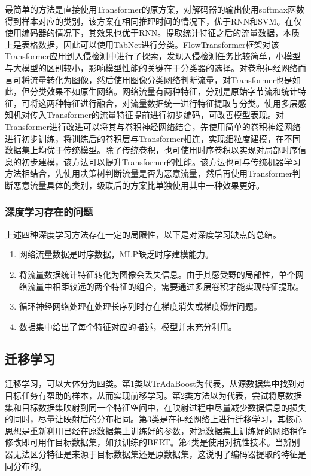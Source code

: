 最简单的方法是直接使用Transformer的原方案，对解码器的输出使用softmax函数得到样本对应的类别，该方案在相同推理时间的情况下，优于RNN和SVM\cite{10.1109/ACCESS.2022.3182333}。在仅使用编码器的情况下，其效果也优于RNN\cite{10.1016/j.comnet.2023.110072}。提取统计特征之后的流量数据，本质上是表格数据，因此可以使用TabNet进行分类\cite{PMID:37844095}。FlowTransformer框架对该Transformer应用到入侵检测中进行了探索，发现入侵检测任务比较简单，小模型与大模型的区别较小，影响模型性能的关键在于分类器的选择\cite{10.1016/j.eswa.2023.122564}。对卷积神经网络而言可将流量转化为图像，然后使用图像分类网络判断流量，对Transformer也是如此，但分类效果不如原生网络\cite{10.1109/ACCESS.2022.3200034}。网络流量有两种特征，分别是原始字节流和统计特征，可将这两种特征进行融合，对流量数据统一进行特征提取与分类\cite{10.1145/3511808.3557549}。使用多层感知机对传入Transformer的流量特征提前进行初步编码，可改善模型表现\cite{10.1016/j.cose.2023.103171}。对Transformer进行改进可以将其与卷积神经网络结合，先使用简单的卷积神经网络进行初步训练，将训练后的卷积层与Transformer相连，实现细粒度建模，在不同数据集上均优于传统模型\cite{10.1007/s11042-022-14121-2}。除了传统卷积，也可使用时序卷积以实现对局部时序信息的初步建模，该方法可以提升Transformer的性能\cite{10.1109/ACCESS.2022.3175516}。该方法也可与传统机器学习方法相结合，先使用决策树判断流量是否为恶意流量，然后再使用Transformer判断恶意流量具体的类别，级联后的方案比单独使用其中一种效果更好\cite{10.1109/ICDMW58026.2022.00081}。

\subsubsection{深度学习存在的问题}
上述四种深度学习方法存在一定的局限性，以下是对深度学习缺点的总结。
\begin{enumerate}
    \item 网络流量数据是时序数据，MLP缺乏时序建模能力。
    \item 将流量数据统计特征转化为图像会丢失信息。由于其感受野的局部性，单个网络流量中相距较远的两个特征的组合，需要通过多层卷积才能实现特征提取。
    \item 循环神经网络处理在处理长序列时存在梯度消失或梯度爆炸问题。
    \item 数据集中给出了每个特征对应的描述，模型并未充分利用。
\end{enumerate}

\subsection{迁移学习}
迁移学习，可以大体分为四类。第1类以TrAdaBoost\cite{10.1145/1273496.1273521}为代表，从源数据集中找到对目标任务有帮助的样本，从而实现前移学习。第2类方法以\cite{10.1109/TNN.2010.2091281}为代表，尝试将原数据集和目标数据集映射到同一个特征空间中，在映射过程中尽量减少数据信息的损失的同时，尽量让映射后的分布相同。第3类是在神经网络上进行迁移学习，其核心思想是重新利用已经在原数据集上训练好的参数，对源数据集上训练好的网络稍作修改即可用作目标数据集，如预训练的BERT\cite{10.18653/v1/N19-1423}。第4类是使用对抗性技术\cite{NIPS2006_b1b0432c}。当辨别器无法区分特征是来源于目标数据集还是原数据集，这说明了编码器提取的特征是同分布的。

